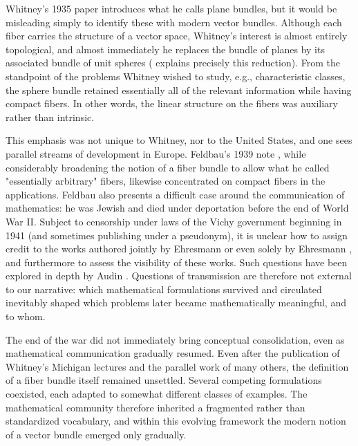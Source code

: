 \documentclass[11pt,leqno]{article}
\renewcommand{\1}{{\rm 1\hspace*{-0.4ex}%
\rule{0.1ex}{1.52ex}\hspace*{0.2ex}}}
\newcommand{\<}[1]{{\langle}#1 {\rangle}}
\newcounter{intro}
\theoremstyle{plain}
\theoremstyle{definition}
\theoremstyle{remark}
\numberwithin{equation}{subsection}
\begin{document}
Whitney's 1935 paper \cite{Whitneyspherespace} introduces what he calls plane bundles, but it would be misleading simply to identify these with modern vector bundles. Although each fiber carries the structure of a vector space, Whitney's interest is almost entirely topological, and almost immediately he replaces the bundle of planes by its associated bundle of unit spheres (\cite[\S 10]{Whitneyspherespace} explains precisely this reduction). From the standpoint of the problems Whitney wished to study, e.g., characteristic classes, the sphere bundle retained essentially all of the relevant information while having compact fibers. In other words, the linear structure on the fibers was auxiliary rather than intrinsic.

This emphasis was not unique to Whitney, nor to the United States, and one sees parallel streams of development in Europe.  Feldbau's 1939 note \cite{feldbau_classification_1939}, while considerably broadening the notion of a fiber bundle to allow what he called "essentially arbitrary" fibers, likewise concentrated on compact fibers in the applications.  Feldbau also presents a difficult case around the communication of mathematics: he was Jewish and died under deportation before the end of
World War II.  Subject to censorship under laws of the Vichy government
beginning in 1941 (and sometimes publishing under a pseudonym), it is
unclear how to assign credit to the works authored jointly by Ehresmann \cite{ehresmann_feldbau_homotopie_1941} or even solely by Ehresmann \cite{ehresmann_espaces_associes_1941}, and furthermore to assess the visibility of these works.  Such questions have been explored in depth by Audin \cite{audin_feldbau_2009}.  Questions of transmission are therefore not external to our narrative: which mathematical formulations survived and circulated inevitably shaped which problems later became mathematically meaningful, and to whom.

The end of the war did not immediately bring conceptual consolidation, even as mathematical communication gradually resumed. Even after the publication of Whitney's Michigan lectures and the parallel work of many others, the definition of a fiber bundle itself remained unsettled. Several competing formulations coexisted, each adapted to somewhat different classes of examples. The mathematical community therefore inherited a fragmented rather than standardized vocabulary, and within this evolving framework the modern notion of a vector bundle emerged only gradually.
\end{document}
